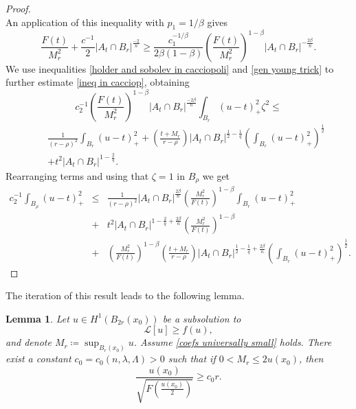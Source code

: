 \documentclass[12pt,a4paper]{amsart}
\numberwithin{equation}{section} %
\newtheorem{lemma}[theorem]{Lemma}
\theoremstyle{definition}
\theoremstyle{remark}
\begin{document}
\begin{proof}
$$$$
An application of this inequality with $p_1 = 1/\beta$ gives
\begin{equation}\label{gen young trick}
     \frac{F(t)}{M_r^2} + \frac{c^{-1}}{2}|A_t \cap B_r|^{\frac{-2}{n}} \geq \frac{c_1^{-1/\beta}}{2\beta(1-\beta)} \left(\frac{F(t)}{M_r^2} \right)^{1-\beta}|A_t \cap B_r|^{-\frac{2\beta}{n}}.
\end{equation}
We use inequalities \eqref{holder and sobolev in cacciopoli} and \eqref{gen young trick} to further estimate \eqref{ineq in cacciop}, obtaining
$$
     c_2^{-1} \left(\frac{F(t)}{M_r^2} \right)^{1-\beta}|A_t \cap B_r|^{\frac{-2\beta}{n}}\int_{B_r}(u-t)_+^2\zeta^2 \leq 
$$
\begin{eqnarray*}
    & & \frac{1}{(r-\rho)^2} \int_{B_r} (u-t)_+^2 + \left(\frac{t+M_r}{r-\rho}\right)|A_t \cap B_r|^{\frac{1}{2} - \frac{1}{q}}\left(\int_{B_r}(u-t)^2_+ \right)^{\frac{1}{2}}\\
    & & +  t^2 |A_t \cap B_r|^{1-\frac{2}{q}}.
\end{eqnarray*}
Rearranging terms and using that $\zeta = 1$ in $B_{\rho}$ we get
\begin{eqnarray*}
    c_2^{-1}\int_{B_\rho}(u-t)_+^2 & \leq & \frac{1}{(r-\rho)^2}|A_t \cap B_r|^{\frac{2\beta}{n}} \left(\frac{M_r^2}{F(t)} \right)^{1-\beta} \int_{B_r} (u-t)_+^2\\
    & + & t^2|A_t \cap B_r|^{1 - \frac{2}{q}+\frac{2\beta}{n}}\left(\frac{M_r^2}{F(t)} \right)^{1-\beta}\\
    & + & \left(\frac{M_r^2}{F(t)} \right)^{1-\beta}\left(\frac{t+M_r}{r-\rho}\right)|A_t \cap B_r|^{\frac{1}{2} - \frac{1}{q} + \frac{2\beta}{n}}\left(\int_{B_r}(u-t)^2_+ \right)^{\frac{1}{2}}.
\end{eqnarray*}
\end{proof}

The iteration of this result leads to the following lemma.

\begin{lemma}\label{est from below}
Let $u \in H^1(B_{2r}(x_0))$ be a subsolution to
$$
    \mathcal{L}[u] \geq f(u),
$$
and denote $M_r \coloneqq \sup_{B_r(x_0)}u$. Assume \eqref{coefs universally small} holds. There exist a constant $c_0 = c_0(n,\lambda,\Lambda)>0$ such that if $0 < M_r \leq 2u(x_0)$, then
$$
    \frac{u(x_0)}{\sqrt{F\left(\frac{u(x_0)}{2} \right)}} \geq c_0r.
$$
\end{lemma}
\end{document}
